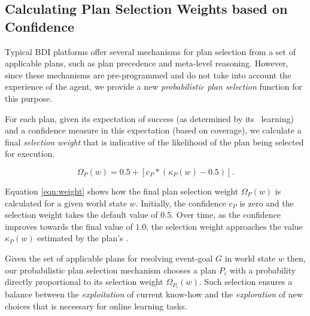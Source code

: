 \subsection{Calculating Plan Selection Weights based on Confidence}


Typical BDI platforms offer several mechanisms for plan selection from a set of applicable plans, such as plan precedence and meta-level reasoning. However, since these mechanisms are pre-programmed and do not take into account the experience of the agent, we provide a new \textit{probabilistic plan selection} function for this purpose. 

For each plan, given its expectation of success (as determined by its \dt\ learning) and a confidence measure in this expectation (based on coverage), we calculate a final \textit{selection weight} that is indicative of the likelihood of the plan being selected for execution.

\begin{equation}\label{eqn:weight}   
\Omega_P(w) = 0.5 + \left[  c_P *  \left( \kappa_P(w) - 0.5 \right)  \right].
\end{equation}

Equation \ref{eqn:weight} shows how the final plan selection weight $\Omega_P(w)$ is calculated for a given world state $w$. Initially, the confidence $c_P$ is zero and the selection weight takes the default value of $0.5$. Over time, as the confidence improves towards the final value of $1.0$, the selection weight approaches the value $\kappa_P(w)$ estimated by the plan's \dt.

Given the set of applicable plans for resolving event-goal $G$ in world state $w$ then, our probabilistic plan selection mechanism chooses a plan $P_i$ with a probability directly proportional to its selection weight $\Omega_{P_i}(w)$. Such selection ensures a balance between the \emph{exploitation} of current know-how and the \textit{exploration} of new choices that is necessary for online learning tasks. 



